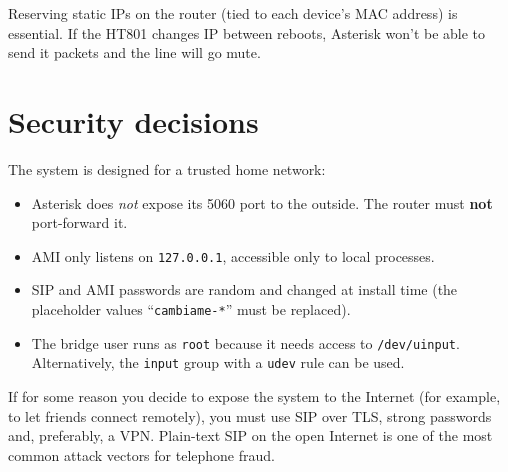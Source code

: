 \begin{tip}
Reserving static IPs on the router (tied to each device's MAC address) is essential. If the HT801 changes IP between reboots, Asterisk won't be able to send it packets and the line will go mute.
\end{tip}

\section{Security decisions}

The system is designed for a trusted home network:

\begin{itemize}
  \item Asterisk does \emph{not} expose its 5060 port to the outside. The router must \textbf{not} port-forward it.
  \item AMI only listens on \texttt{127.0.0.1}, accessible only to local processes.
  \item SIP and AMI passwords are random and changed at install time (the placeholder values ``\texttt{cambiame-*}'' must be replaced).
  \item The bridge user runs as \texttt{root} because it needs access to \texttt{/dev/uinput}. Alternatively, the \texttt{input} group with a \texttt{udev} rule can be used.
\end{itemize}

\begin{warning}
If for some reason you decide to expose the system to the Internet (for example, to let friends connect remotely), you must use SIP over TLS, strong passwords and, preferably, a VPN. Plain-text SIP on the open Internet is one of the most common attack vectors for telephone fraud.
\end{warning}
